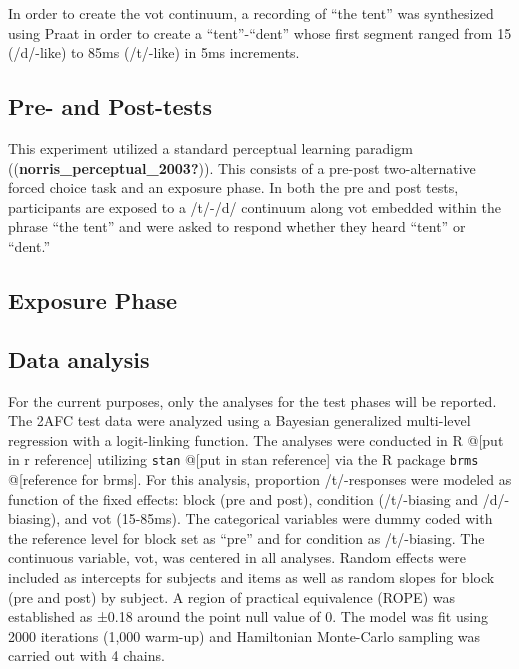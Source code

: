 \documentclass[
  english,
  man]{apa6}
\begin{document}
In order to create the vot continuum, a recording of ``the tent'' was synthesized using Praat in order to create a ``tent''-``dent'' whose first segment ranged from 15 (/d/-like) to 85ms (/t/-like) in 5ms increments.

\hypertarget{pre--and-post-tests}{%
\subsection{Pre- and Post-tests}\label{pre--and-post-tests}}

This experiment utilized a standard perceptual learning paradigm ((\textbf{norris\_perceptual\_2003?})). This consists of a pre-post two-alternative forced choice task and an exposure phase. In both the pre and post tests, participants are exposed to a /t/-/d/ continuum along vot embedded within the phrase ``the tent'' and were asked to respond whether they heard ``tent'' or ``dent.''

\hypertarget{exposure-phase}{%
\subsection{Exposure Phase}\label{exposure-phase}}

\hypertarget{data-analysis}{%
\subsection{Data analysis}\label{data-analysis}}

For the current purposes, only the analyses for the test phases will be reported. The 2AFC test data were analyzed using a Bayesian generalized multi-level regression with a logit-linking function. The analyses were conducted in R @{[}put in r reference{]} utilizing \texttt{stan} @{[}put in stan reference{]} via the R package \texttt{brms} @{[}reference for brms{]}. For this analysis, proportion /t/-responses were modeled as function of the fixed effects: block (pre and post), condition (/t/-biasing and /d/-biasing), and vot (15-85ms). The categorical variables were dummy coded with the reference level for block set as ``pre'' and for condition as /t/-biasing. The continuous variable, vot, was centered in all analyses. Random effects were included as intercepts for subjects and items as well as random slopes for block (pre and post) by subject. A region of practical equivalence (ROPE) was established as ±0.18 around the point null value of 0. The model was fit using 2000 iterations (1,000 warm-up) and Hamiltonian Monte-Carlo sampling was carried out with 4 chains.
\end{document}
